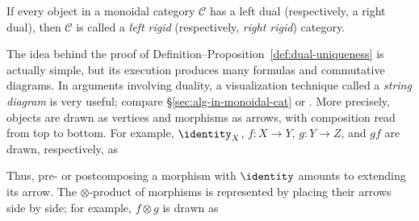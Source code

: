 \begin{definition}\label{def:rigid-cat}
	If every object in a monoidal category $\mathcal{C}$ has a left dual
	(respectively, a right dual), then $\mathcal{C}$ is called a \emph{left
	rigid} (respectively, \emph{right rigid}) category.
\end{definition}

The idea behind the proof of
Definition--Proposition~\ref{def:dual-uniqueness} is actually simple, but its
execution produces many formulas and commutative diagrams. In arguments
involving duality, a visualization technique called a \emph{string diagram}
is very useful; compare \S\ref{sec:alg-in-monoidal-cat} or
\cite[Proof of Theorem 2.6.12]{Li1}. More precisely, objects are drawn as
vertices and morphisms as arrows, with composition read from top to bottom.
For example, $\identity_X$, $f:X\to Y$, $g:Y\to Z$, and $gf$ are drawn,
respectively, as
\begin{center}\end{center}

Thus, pre- or postcomposing a morphism with $\identity$ amounts to extending
its arrow. The $\otimes$-product of morphisms is represented by placing
their arrows side by side; for example, $f\otimes g$ is drawn as
\begin{center}\end{center}

